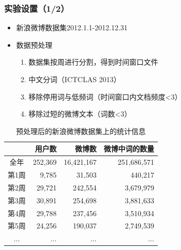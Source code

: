 \begin{frame}
\frametitle{\noindent 实验设置（1/2）}
\begin{itemize}
	\item 新浪微博数据集2012.1.1-2012.12.31
	\item 数据预处理
	\begin{enumerate}
		\item 数据集按周进行分割，得到时间窗口文件
		\item 中文分词（ICTCLAS 2013）
		\item 移除停用词与低频词（时间窗口内文档频度<3）
		\item 移除过短的微博文本（词数<3）
	\end{enumerate}
\end{itemize}

\begin{table}
\setlength{\abovecaptionskip}{0.cm}
\setlength{\belowcaptionskip}{0.cm}
\scriptsize
\centering
\caption{预处理后的新浪微博数据集上的统计信息}
\begin{tabular}{|c|r|r|r|} \hline
 & 用户数 & 微博数 & 微博中词的数量 \\ \hline
全年& 252,369 & 16,421,167 & 251,686,571\\ \hline
第1周 & 9,785 & 31,503 & 440,217 \\ \hline
第2周 & 29,721 & 242,554 & 3,679,979 \\ \hline
第3周 & 30,891 & 254,698 & 3,881,633 \\ \hline
第4周 & 29,788 & 237,456 & 3,510,934 \\ \hline
第5周 & 24,256 & 190,037 & 2,749,539 \\ \hline
\(\dots\) & \(\dots\) & \(\dots\) & \(\dots\) \\ \hline
\end{tabular}
\label{statisticsOfDataset}
\end{table}
\end{frame}

